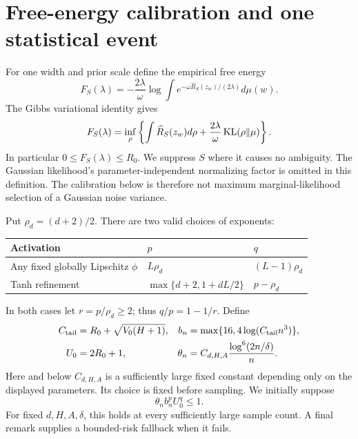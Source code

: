 \section{Free-energy calibration and one statistical event}
\label{ag-sec:adaptive-core}
For one width and prior scale define the empirical free energy
\[
 F_S(\lambda)=-\frac{2\lambda}{\omega}\log
 \int e^{-\omega\widehat R_S(z_w)/(2\lambda)}d\mu(w).
\]
The Gibbs variational identity gives
\begin{equation}
 F_S(\lambda)=\inf_\rho\left\{\int\widehat R_S(z_w)d\rho
                    +\frac{2\lambda}{\omega}\operatorname{KL}(\rho\Vert\mu)\right\}.
 \label{ag-eq:variational}
\end{equation}
In particular $0\le F_S(\lambda)\le R_0$. We suppress $S$ where it causes no ambiguity. The Gaussian likelihood's parameter-independent normalizing factor is omitted in this definition. The calibration below is therefore not maximum marginal-likelihood selection of a Gaussian noise variance.

Put $\rho_d=(d+2)/2$. There are two valid choices of exponents:
\begin{center}
\begin{tabular}{lll}
\toprule
Activation & $p$ & $q$ \\
\midrule
Any fixed globally Lipschitz $\phi$ & $L\rho_d$ & $(L-1)\rho_d$ \\
Tanh refinement & $\max\{d+2,1+dL/2\}$ & $p-\rho_d$ \\
\bottomrule
\end{tabular}
\end{center}
In both cases let $r=p/\rho_d\ge2$; thus $q/p=1-1/r$.
Define
\begin{align}
 C_{\rm tail}&=R_0+\sqrt{V_0(H+1)},&
 b_n&=\max\{16,4\log(C_{\rm tail}n^3)\},\notag\\
 U_0&=2R_0+1,&
 \theta_n&=C_{d,H,A}\frac{\log^6(2n/\delta)}n.
 \label{ag-eq:calibration-constants}
\end{align}
Here and below $C_{d,H,A}$ is a sufficiently large fixed constant depending only on the displayed parameters. Its choice is fixed before sampling. We initially suppose
\begin{equation}
 \theta_n b_n^p U_0^q\le1.
 \label{ag-eq:admissibility}
\end{equation}
For fixed $d,H,A,\delta$, this holds at every sufficiently large sample count. A final remark supplies a bounded-risk fallback when it fails.

